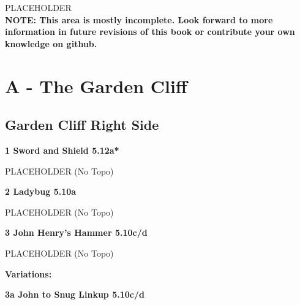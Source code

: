 

\raggedcolumns
\begin{multicols}{2}
\end{multicols}
\begin{multicols}{2}
PLACEHOLDER\\

\textbf{NOTE: This area is mostly incomplete. Look forward to more information in future revisions of this book or contribute your own knowledge on github.}\\
\newpage
		\section{A - The Garden Cliff}\label{sa:The Garden Cliff}
	
	
		\subsection*{Garden Cliff Right Side}\label{bf:Garden Cliff Right Side}
			
			\label{rt:Sword and Shield}
\colorbox{Goldenrod!50}{
\parbox{0.95\linewidth}{
\textbf{
1 Sword and Shield 5.12a*  
}
}
}

			\begin{adjustwidth}{0.5cm}{}				
			PLACEHOLDER
				\newline (No Topo) 
			\end{adjustwidth}
			\label{rt:Ladybug}
\colorbox{RoyalBlue!20}{
\parbox{0.95\linewidth}{
\textbf{
2 Ladybug 5.10a  
}
}
}

			\begin{adjustwidth}{0.5cm}{}				
			PLACEHOLDER
				\newline (No Topo) 
			\end{adjustwidth}
			\label{rt:John Henry's Hammer}
\colorbox{RoyalBlue!20}{
\parbox{0.95\linewidth}{
\textbf{
3 John Henry's Hammer 5.10c/d  
}
}
}

			\begin{adjustwidth}{0.5cm}{}				
			PLACEHOLDER
				\newline (No Topo) 
			\end{adjustwidth}
				\begin{adjustwidth}{0.5cm}{}				
				\textbf{Variations:} \newline
					\label{vr:John to Snug Linkup}
\colorbox{RoyalBlue!20}{
\parbox{0.95\linewidth}{
\textbf{
3a John to Snug Linkup 5.10c/d  
}
}
}


\end{adjustwidth}
\end{multicols}
